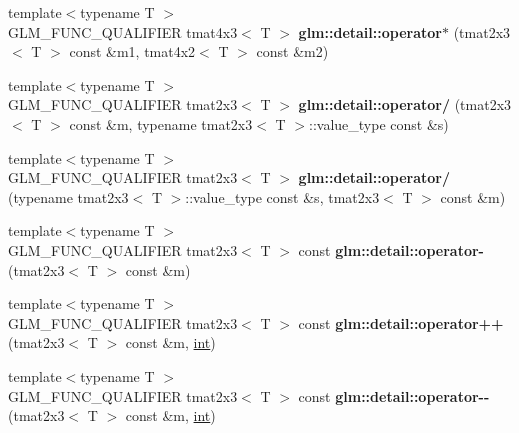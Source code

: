 \begin{DoxyCompactItemize}
\item 
\hypertarget{namespaceglm_1_1detail_ace87d0c43f31221f6da2943730e4aa28}{}{\footnotesize template$<$typename T $>$ }\\G\+L\+M\+\_\+\+F\+U\+N\+C\+\_\+\+Q\+U\+A\+L\+I\+F\+I\+E\+R tmat4x3$<$ T $>$ {\bfseries glm\+::detail\+::operator$\ast$} (tmat2x3$<$ T $>$ const \&m1, tmat4x2$<$ T $>$ const \&m2)\label{namespaceglm_1_1detail_ace87d0c43f31221f6da2943730e4aa28}

\item 
\hypertarget{namespaceglm_1_1detail_a5e6a803b33f653dc85fb09e2e4d3d68b}{}{\footnotesize template$<$typename T $>$ }\\G\+L\+M\+\_\+\+F\+U\+N\+C\+\_\+\+Q\+U\+A\+L\+I\+F\+I\+E\+R tmat2x3$<$ T $>$ {\bfseries glm\+::detail\+::operator/} (tmat2x3$<$ T $>$ const \&m, typename tmat2x3$<$ T $>$\+::value\+\_\+type const \&s)\label{namespaceglm_1_1detail_a5e6a803b33f653dc85fb09e2e4d3d68b}

\item 
\hypertarget{namespaceglm_1_1detail_a11c49bf431886b417faeb5894d72c512}{}{\footnotesize template$<$typename T $>$ }\\G\+L\+M\+\_\+\+F\+U\+N\+C\+\_\+\+Q\+U\+A\+L\+I\+F\+I\+E\+R tmat2x3$<$ T $>$ {\bfseries glm\+::detail\+::operator/} (typename tmat2x3$<$ T $>$\+::value\+\_\+type const \&s, tmat2x3$<$ T $>$ const \&m)\label{namespaceglm_1_1detail_a11c49bf431886b417faeb5894d72c512}

\item 
\hypertarget{namespaceglm_1_1detail_a03176ecd956bcab7d0c42a6356c6926c}{}{\footnotesize template$<$typename T $>$ }\\G\+L\+M\+\_\+\+F\+U\+N\+C\+\_\+\+Q\+U\+A\+L\+I\+F\+I\+E\+R tmat2x3$<$ T $>$ const {\bfseries glm\+::detail\+::operator-\/} (tmat2x3$<$ T $>$ const \&m)\label{namespaceglm_1_1detail_a03176ecd956bcab7d0c42a6356c6926c}

\item 
\hypertarget{namespaceglm_1_1detail_a2c6bdfdc257101b34a881301be5de303}{}{\footnotesize template$<$typename T $>$ }\\G\+L\+M\+\_\+\+F\+U\+N\+C\+\_\+\+Q\+U\+A\+L\+I\+F\+I\+E\+R tmat2x3$<$ T $>$ const {\bfseries glm\+::detail\+::operator++} (tmat2x3$<$ T $>$ const \&m, \hyperlink{_s_d_l__thread_8h_a6a64f9be4433e4de6e2f2f548cf3c08e}{int})\label{namespaceglm_1_1detail_a2c6bdfdc257101b34a881301be5de303}

\item 
\hypertarget{namespaceglm_1_1detail_a63ebd9a1a6fc2a74617e8d5d09d9b40f}{}{\footnotesize template$<$typename T $>$ }\\G\+L\+M\+\_\+\+F\+U\+N\+C\+\_\+\+Q\+U\+A\+L\+I\+F\+I\+E\+R tmat2x3$<$ T $>$ const {\bfseries glm\+::detail\+::operator-\/-\/} (tmat2x3$<$ T $>$ const \&m, \hyperlink{_s_d_l__thread_8h_a6a64f9be4433e4de6e2f2f548cf3c08e}{int})\label{namespaceglm_1_1detail_a63ebd9a1a6fc2a74617e8d5d09d9b40f}


\end{DoxyCompactItemize}
